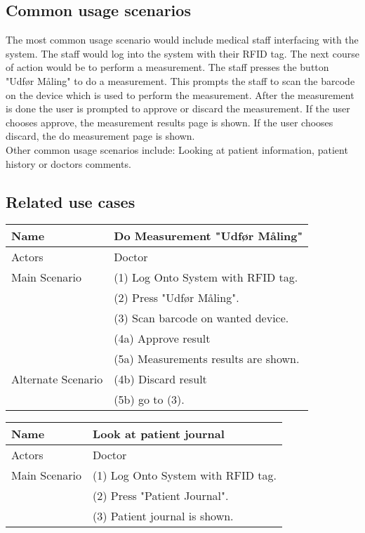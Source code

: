\subsection{Common usage scenarios}
The most common usage scenario would include medical staff interfacing with the system. The staff would log into the system with their RFID tag. The next course of action would be to perform a measurement. The staff presses the button "Udfør Måling" to do a measurement. This prompts the staff to scan the barcode on the  device which is used to perform the measurement. After the measurement is done the user is prompted to approve or discard the measurement. If the user chooses approve, the measurement results page is shown. If the user chooses discard, the do measurement page is shown.\\
Other common usage scenarios include: Looking at patient information, patient history or doctors comments.

\subsection{Related use cases}

\begin{table}[H]
    \begin{tabular}{|p{4cm}|p{8cm}|}
    \hline
    Name          & Do Measurement "Udfør Måling"   \\\hline
    Actors        & Doctor \\\hline
    Main Scenario & (1) Log Onto System with RFID tag. \\
    ~             & (2) Press "Udfør Måling". \\
    ~             & (3) Scan barcode on wanted device. \\
    ~             & (4a) Approve result \\         
    ~             & (5a) Measurements results are shown.\\\hline
    
    Alternate Scenario & (4b) Discard result \\
        ~             & (5b) go to (3).\\\hline
    \end{tabular}
\end{table}

\begin{table}[H]
    \begin{tabular}{|p{4cm}|p{8cm}|}
    \hline
    Name          & Look at patient journal   \\\hline
    Actors        & Doctor \\\hline
    Main Scenario & (1) Log Onto System with RFID tag. \\
    ~             & (2) Press "Patient Journal". \\  
    ~             & (3) Patient journal is shown.\\\hline
    \end{tabular}
\end{table}

